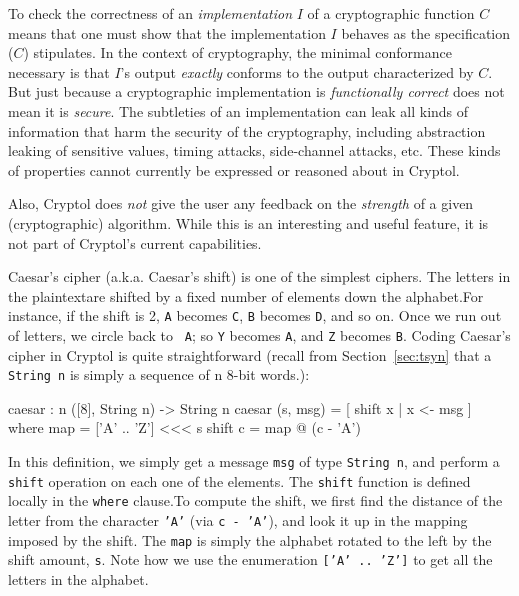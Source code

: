To check the correctness of an \emph{implementation} $I$ of a
cryptographic function $C$ means that one must show that the
implementation $I$ behaves as the specification ($C$) stipulates.  In
the context of cryptography, the minimal conformance necessary is
that $I$'s output \emph{exactly} conforms to the output characterized
by $C$.  But just because a cryptographic implementation is
\emph{functionally correct} does not mean it is \emph{secure}.  The
subtleties of an implementation can leak all kinds of information that
harm the security of the cryptography, including abstraction leaking
of sensitive values, timing attacks, side-channel attacks, etc.  These
kinds of properties cannot currently be expressed or reasoned about in
Cryptol.

Also, Cryptol does \emph{not} give the user any feedback on the
\emph{strength} of a given (cryptographic) algorithm.  While this is
an interesting and useful feature, it is not part of Cryptol's current
capabilities.


Caesar's cipher (a.k.a. Caesar's shift) is one of the simplest
ciphers.  The letters in the plaintext\indPlaintext are shifted by a
fixed number of elements down the alphabet.\indCaesarscipher For
instance, if the shift is 2, {\tt A} becomes {\tt C}, {\tt B} becomes
{\tt D}, and so on. Once we run out of letters, we circle back to {\tt
  A}; so {\tt Y} becomes {\tt A}, and {\tt Z} becomes {\tt B}.  Coding
Caesar's cipher in Cryptol is quite straightforward (recall from
Section~\ref{sec:tsyn} that a {\tt String n} is simply a sequence of n
8-bit words.):\indTSString
\begin{code}
  caesar : {n} ([8], String n) -> String n
  caesar (s, msg) = [ shift x | x <- msg ]
        where map     = ['A' .. 'Z'] <<< s
              shift c = map @ (c - 'A')
\end{code}
In this definition, we simply get a message \texttt{msg} of type
\texttt{String n}, and perform a \texttt{shift} operation on each one
of the elements. The \texttt{shift} function is defined locally in the
\texttt{where} clause.\indWhere To compute the shift, we first find
the distance of the letter from the character \texttt{'A'} (via
\texttt{c - 'A'}), and look it up in the mapping imposed by the shift.
The {\tt map} is simply the alphabet rotated to the left by the shift
amount, \texttt{s}. Note how we use the enumeration
\texttt{['A' ..\ 'Z']} to get all the letters in the alphabet.\indEnum

